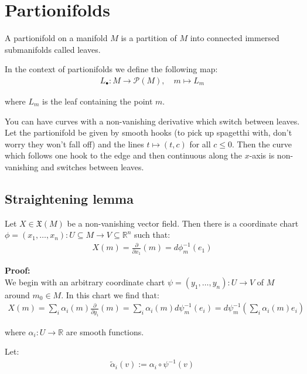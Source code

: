 




	\section{Partionifolds}
		A partionifold on a manifold $M$ is a partition of $M$ into connected immersed submanifolds called leaves. \bigskip

		In the context of partionifolds we define the following map:
%
		\begin{align*}
			L_\bullet : M \to \mathcal{P}(M), \quad m \mapsto L_m
		\end{align*}

		where $L_m$ is the leaf containing the point $m$. \bigskip

		You can have curves with a non-vanishing derivative which switch between leaves. Let the partionifold be given by smooth hooks (to pick up spagetthi with, don't worry they won't fall off) and the lines $t \mapsto (t, c)$ for all $c \leq 0$. Then the curve which follows one hook to the edge and then continuous along the $x$-axis is non-vanishing and switches between leaves. \bigskip

		\subsection{Straightening lemma}
			Let $X \in \mathfrak{X}(M)$ be a non-vanishing vector field. Then there is a coordinate chart $\phi = (x_1, \ldots, x_n) : U \subseteq M \to V \subseteq \mathbb{R}^n$ such that:
			\begin{align*}
				X(m) = \frac{\partial}{\partial x_1}(m) = d \phi_m^{-1}(e_1)
			\end{align*}

			\textbf{Proof:} \\
				We begin with an arbitrary coordinate chart $\psi = (y_1, \ldots, y_n) : U \to V$ of $M$ around $m_0 \in M$. In this chart we find that:
				\begin{align*}
					X(m) = \sum_i \alpha_i(m) \frac{\partial}{\partial y_i}(m) = \sum_i \alpha_i(m) d \psi_m^{-1}(e_i) = d \psi_m^{-1}\left(\sum_i \alpha_i(m) e_i\right)
				\end{align*}

				where $\alpha_i : U \to \mathbb{R}$ are smooth functions. \bigskip

				Let:
				\begin{align*}
					\tilde{\alpha}_i(v) := \alpha_i \circ \psi^{-1}(v)
				\end{align*}

